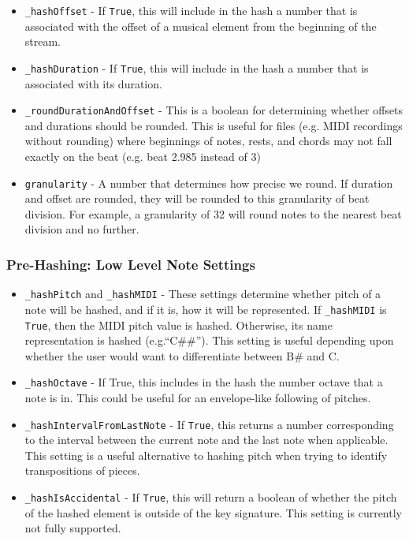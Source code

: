                     \begin{itemize}
                    \item \texttt{\_hashOffset} - If \texttt{True}, this will include in the hash a number that is associated with the offset of a musical element from the beginning of the stream. 
                    \item \texttt{\_hashDuration} - If \texttt{True}, this will include in the hash a number that is associated with its duration.
                    \item \texttt{\_roundDurationAndOffset} - This is a boolean for determining whether offsets and durations should be rounded. This is useful for files (e.g. MIDI recordings without rounding) where beginnings of notes, rests, and chords may not fall exactly on the beat (e.g. beat 2.985 instead of 3)
                    \item \texttt{granularity} - A number that determines how precise we round. If duration and offset are rounded, they will be rounded to this granularity of beat division. For example, a granularity of 32 will round notes to the nearest  beat division and no further.
                    \end{itemize}
        
        \subsubsection{Pre-Hashing: Low Level Note Settings}
                    \begin{itemize}
                    \item \texttt{\_hashPitch} and \texttt{\_hashMIDI} - These settings determine whether pitch of a note will be hashed, and if it is, how it will be represented. If \texttt{\_hashMIDI} is \texttt{True}, then the MIDI pitch value is hashed. Otherwise, its name representation is hashed (e.g.``C\#\#''). This setting is useful depending upon whether the user would want to differentiate between B\# and C.
                    \item \texttt{\_hashOctave} - If True, this includes in the hash the number octave that a note is in. This could be useful for an envelope-like following of pitches. 
                    \item \texttt{\_hashIntervalFromLastNote} - If \texttt{True}, this returns a number corresponding to the interval between the current note and the last note when applicable. This setting is a useful alternative to hashing pitch when trying to identify transpositions of pieces.
                    \item \texttt{\_hashIsAccidental} - If \texttt{True}, this will return a boolean of whether the pitch of the hashed element is outside of the key signature. This setting is currently not fully supported. 
                    \end{itemize}
